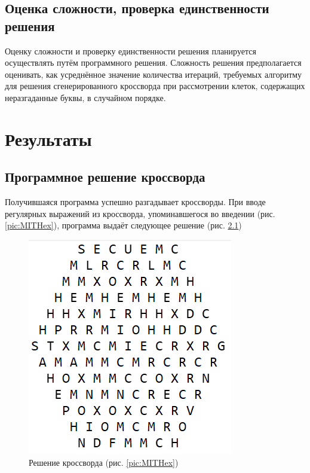 \documentclass[12pt]{report}
\begin{document}
\section{Оценка сложности, проверка единственности решения} Оценку сложности и проверку единственности решения планируется осуществлять путём программного решения.
        Сложность решения предполагается оценивать, как усреднённое значение количества итераций, требуемых алгоритму для решения сгенерированного кроссворда при рассмотрении клеток, содержащих неразгаданные буквы, в случайном порядке.
   

    \newpage %
    
\chapter{Результаты}
\section{Программное решение кроссворда}
Получившаяся программа успешно разгадывает кроссворды. При вводе регулярных выражений из кроссворда, упоминавшегося во введении (рис. \ref{pic:MITHex}), программа выдаёт следующее решение (рис. \ref{pic:MITSolution})
\begin{figure}[ht!]
 \centering
    \includegraphics[scale=1.0]{HexagonalOutput1.PNG}
    \caption{\label{pic:MITSolution}Решение кроссворда (рис. \ref{pic:MITHex})}
\end{figure}
\end{document}
